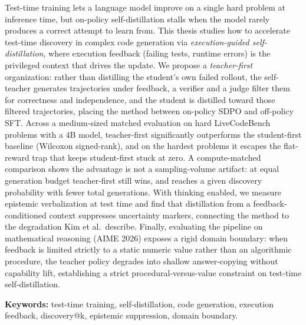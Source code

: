 Test-time training lets a language model improve on a single hard
problem at inference time, but on-policy self-distillation stalls when
the model rarely produces a correct attempt to learn from. This thesis
studies how to accelerate test-time discovery in complex code generation
via \emph{execution-guided self-distillation}, where execution feedback
(failing tests, runtime errors) is the privileged context that drives
the update. We propose a \emph{teacher-first} organization: rather than
distilling the student's own failed rollout, the self-teacher generates
trajectories under feedback, a verifier and a judge filter them for
correctness and independence, and the student is distilled toward those
filtered trajectories, placing the method between on-policy SDPO and
off-policy SFT. Across a medium-sized matched evaluation on hard
LiveCodeBench problems with a 4B model, teacher-first significantly
outperforms the student-first baseline (Wilcoxon signed-rank), and on
the hardest problems it escapes the flat-reward trap that keeps
student-first stuck at zero. A compute-matched comparison shows the
advantage is not a sampling-volume artifact: at equal generation budget
teacher-first still wins, and reaches a given discovery probability with
fewer total generations. With thinking enabled, we measure epistemic
verbalization at test time and find that distillation from a
feedback-conditioned context suppresses uncertainty markers, connecting
the method to the degradation Kim et al.~describe. Finally, evaluating the
pipeline on mathematical reasoning (AIME 2026) exposes a rigid domain
boundary: when feedback is limited strictly to a static numeric value
rather than an algorithmic procedure, the teacher policy degrades into
shallow answer-copying without capability lift, establishing a strict
procedural-versus-value constraint on test-time self-distillation.

\vspace{0.5cm}
\textbf{Keywords:} test-time training, self-distillation, code
generation, execution feedback, discovery@k, epistemic suppression,
domain boundary.